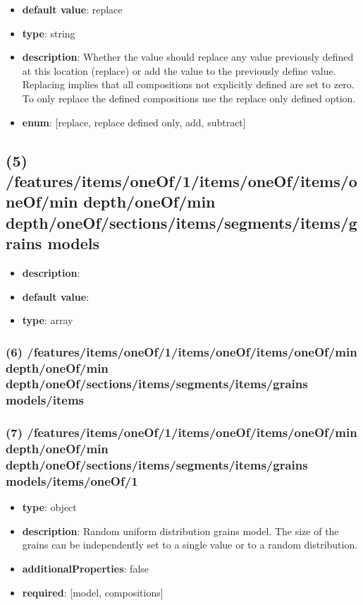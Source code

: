 \begin{itemize}[leftmargin=8em]\item {\bf default value}: replace
\item {\bf type}: string
\item {\bf description}: Whether the value should replace any value previously defined at this location (replace) or add the value to the previously define value. Replacing implies that all compositions not explicitly defined are set to zero. To only replace the defined compositions use the replace only defined option.
\item {\bf enum}: [replace, replace defined only, add, subtract]\end{itemize}\subsection{(5) /features/items/oneOf/1/items/oneOf/items/oneOf/min depth/oneOf/min depth/oneOf/sections/items/segments/items/grains models}
\begin{itemize}[leftmargin=5em]\item {\bf description}: 
\item {\bf default value}: 
\item {\bf type}: array
\end{itemize}\subsubsection{(6) /features/items/oneOf/1/items/oneOf/items/oneOf/min depth/oneOf/min depth/oneOf/sections/items/segments/items/grains models/items}

\subsubsection{(7) /features/items/oneOf/1/items/oneOf/items/oneOf/min depth/oneOf/min depth/oneOf/sections/items/segments/items/grains models/items/oneOf/1}
\begin{itemize}[leftmargin=7em]\item {\bf type}: object
\item {\bf description}: Random uniform distribution grains model. The size of the grains can be independently set to a single value or to a random distribution.
\item {\bf additionalProperties}: false
\item {\bf required}: [model, compositions]\end{itemize}

